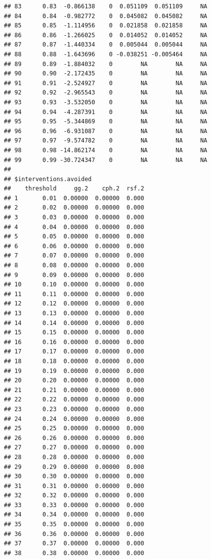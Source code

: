 \documentclass{article}\usepackage[]{graphicx}\usepackage[]{color}
\makeatletter
\newenvironment{kframe}{%
 \def\at@end@of@kframe{}%
 \ifinner\ifhmode%
  \def\at@end@of@kframe{\end{minipage}}%
  \begin{minipage}{\columnwidth}%
 \fi\fi%
 \def\FrameCommand##1{\hskip\@totalleftmargin \hskip-\fboxsep
 \colorbox{shadecolor}{##1}\hskip-\fboxsep
     \hskip-\linewidth \hskip-\@totalleftmargin \hskip\columnwidth}%
 \MakeFramed {\advance\hsize-\width
   \@totalleftmargin\z@ \linewidth\hsize
   \@setminipage}}%
 {\par\unskip\endMakeFramed%
 \at@end@of@kframe}
\newenvironment{knitrout}{}{} %
\makeatother
\begin{document}
\begin{knitrout}
\begin{kframe}
\begin{verbatim}
## 83      0.83  -0.866138    0  0.051109  0.051109     NA
## 84      0.84  -0.982772    0  0.045082  0.045082     NA
## 85      0.85  -1.114956    0  0.021858  0.021858     NA
## 86      0.86  -1.266025    0  0.014052  0.014052     NA
## 87      0.87  -1.440334    0  0.005044  0.005044     NA
## 88      0.88  -1.643696    0 -0.038251 -0.005464     NA
## 89      0.89  -1.884032    0        NA        NA     NA
## 90      0.90  -2.172435    0        NA        NA     NA
## 91      0.91  -2.524927    0        NA        NA     NA
## 92      0.92  -2.965543    0        NA        NA     NA
## 93      0.93  -3.532050    0        NA        NA     NA
## 94      0.94  -4.287391    0        NA        NA     NA
## 95      0.95  -5.344869    0        NA        NA     NA
## 96      0.96  -6.931087    0        NA        NA     NA
## 97      0.97  -9.574782    0        NA        NA     NA
## 98      0.98 -14.862174    0        NA        NA     NA
## 99      0.99 -30.724347    0        NA        NA     NA
## 
## $interventions.avoided
##    threshold     gg.2    cph.2  rsf.2
## 1       0.01  0.00000  0.00000  0.000
## 2       0.02  0.00000  0.00000  0.000
## 3       0.03  0.00000  0.00000  0.000
## 4       0.04  0.00000  0.00000  0.000
## 5       0.05  0.00000  0.00000  0.000
## 6       0.06  0.00000  0.00000  0.000
## 7       0.07  0.00000  0.00000  0.000
## 8       0.08  0.00000  0.00000  0.000
## 9       0.09  0.00000  0.00000  0.000
## 10      0.10  0.00000  0.00000  0.000
## 11      0.11  0.00000  0.00000  0.000
## 12      0.12  0.00000  0.00000  0.000
## 13      0.13  0.00000  0.00000  0.000
## 14      0.14  0.00000  0.00000  0.000
## 15      0.15  0.00000  0.00000  0.000
## 16      0.16  0.00000  0.00000  0.000
## 17      0.17  0.00000  0.00000  0.000
## 18      0.18  0.00000  0.00000  0.000
## 19      0.19  0.00000  0.00000  0.000
## 20      0.20  0.00000  0.00000  0.000
## 21      0.21  0.00000  0.00000  0.000
## 22      0.22  0.00000  0.00000  0.000
## 23      0.23  0.00000  0.00000  0.000
## 24      0.24  0.00000  0.00000  0.000
## 25      0.25  0.00000  0.00000  0.000
## 26      0.26  0.00000  0.00000  0.000
## 27      0.27  0.00000  0.00000  0.000
## 28      0.28  0.00000  0.00000  0.000
## 29      0.29  0.00000  0.00000  0.000
## 30      0.30  0.00000  0.00000  0.000
## 31      0.31  0.00000  0.00000  0.000
## 32      0.32  0.00000  0.00000  0.000
## 33      0.33  0.00000  0.00000  0.000
## 34      0.34  0.00000  0.00000  0.000
## 35      0.35  0.00000  0.00000  0.000
## 36      0.36  0.00000  0.00000  0.000
## 37      0.37  0.00000  0.00000  0.000
## 38      0.38  0.00000  0.00000  0.000

\end{verbatim}
\end{kframe}
\end{knitrout}
\end{document}
